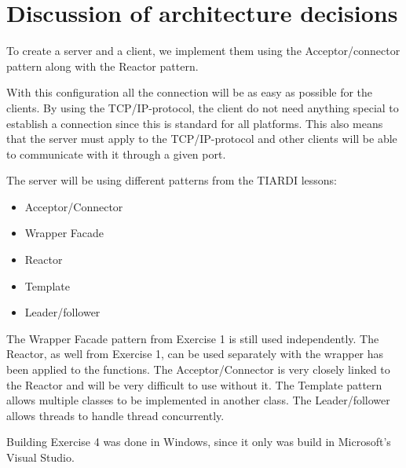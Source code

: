 \documentclass[Main]{subfiles}
\begin{document}
\section{Discussion of architecture decisions}

To create a server and a client, we implement them using the Acceptor/connector pattern along with the Reactor pattern.

With this configuration all the connection will be as easy as possible for the clients.
By using the TCP/IP-protocol, the client do not need anything special to establish a connection since this is standard for all platforms.
This also means that the server must apply to the TCP/IP-protocol and other clients will be able to communicate with it through a given port.


The server will be using different patterns from the TIARDI lessons:
\begin{itemize}
	\item Acceptor/Connector
	\item Wrapper Facade
	\item Reactor
	\item Template
	\item Leader/follower
\end{itemize}

The Wrapper Facade pattern from Exercise 1 is still used independently.
The Reactor, as well from Exercise 1, can be used separately with the wrapper has been applied to the functions. 
The Acceptor/Connector is very closely linked to the Reactor and will be very difficult to use without it.
The Template pattern allows multiple classes to be implemented in another class.
The Leader/follower allows threads to handle thread concurrently.


Building Exercise 4 was done in Windows, since it only was build in Microsoft's Visual Studio.	
\end{document}
